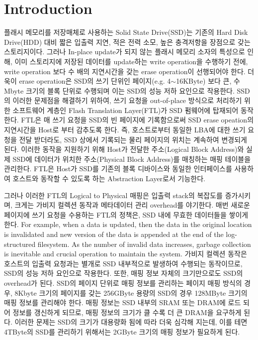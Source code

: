 \documentclass[letterpaper,twocolumn,10pt]{article}
\begin{document}
\section{Introduction}

플래시 메모리를 저장매체로 사용하는 Solid State Drive(SSD)는 기존의 Hard Disk Drive(HDD) 대비 짧은 입출력 지연, 적은 전력 소모, 높은 충격저항을 장점으로 갖는 스토리지이다. 그러나 In-place update가 되지 않는 플래시 메모리 소자의 특성으로 인해, 이미 스토리지에 저장된 데이터를 update하는 write operation을 수행하기 전에, write operation 보다 수 배의 지연시간을 갖는 erase operation이 선행되어야 한다. 더욱이 erase operation은 SSD의 쓰기 단위인 페이지(e.g. 4$\sim$16KByte) 보다 큰, 수 Mbyte 크기의 블록 단위로 수행되며 이는 SSD의 성능 저하 요인으로 작용한다. SSD의 이러한 문제점을 해결하기 위하여, 쓰기 요청을 out-of-place 방식으로 처리하기 위한 소프트웨어 계층인 Flash Translation Layer(FTL)가 SSD 펌웨어에 탑재되어 동작한다. FTL은 매 쓰기 요청을 SSD의 빈 페이지에 기록함으로써 SSD erase opeation의 지연시간을 Host로 부터 감추도록 한다. 즉, 호스트로부터 동일한 LBA에 대한 쓰기 요청을 전달 받더라도, SSD 상에서 기록되는 물리 페이지의 위치는 계속하여 변경되게 된다. 이러한 동작을 지원하기 위해 Host가 전달한 주소(Logical Block Address)와 실제 SSD에 데이터가 위치한 주소(Physical Block Address)를 매칭하는 매핑 테이블을 관리한다. FTL은 Host가 SSD를 기존의 블록 디바이스와 동일한 인터페이스를 사용하여 호스트와 동작할 수 있도록 하는 Abstraction Layer로서 기능한다. 

그러나 이러한 FTL의 Logical to Physical 매핑은 입출력 stack의 복잡도를 증가시키며, 크게는 가비지 컬렉션 동작과 메타데이터 관리 overhead를 야기한다. 매번 새로운 페이지에 쓰기 요청을 수용하는 FTL의 정책은, SSD 내에 무효한 데이터들을 쌓이게 한다. For example, when a data is updated, then the data in the original location is invalidated and new version of the data is appended at the end of the log-structured filesystem. As the number of invalid data increases, garbage collection is inevitable and crucial operation to maintain the system. 가비지 컬렉션 동작은 호스트의 입출력 요청과는 별개로 SSD 내부적으로 발생하여 수행되는 동작이므로, SSD의 성능 저하 요인으로 작용한다. 또한, 매핑 정보 자체의 크기만으로도 SSD의 overhead가 된다. SSD의 페이지 단위로 매핑 정보를 관리하는 페이지 매핑 방식의 경우, 8Kbyte 크기의 페이지를 갖는 256GByte 용량의 SSD의 경우 128MByte 크기의 매핑 정보를 관리해야 한다. 매핑 정보는 SSD 내부의 SRAM 또는 DRAM에 로드 되어 정보를 갱신하게 되므로, 매핑 정보의 크기가 클 수록 더 큰 DRAM을 요구하게 된다. 이러한 문제는 SSD의 크기가 대용량화 됨에 따라 더욱 심각해 지는데, 이를 테면 4TByte의 SSD를 관리하기 위해서는 2GByte 크기의 매핑 정보가 필요하게 된다.
\end{document}
